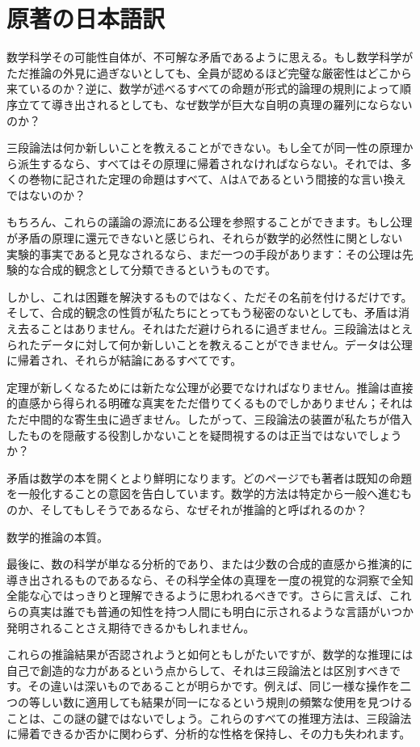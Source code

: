\documentclass[a4paper,11pt,openany]{ltjsbook}
\begin{document}
\section{原著の日本語訳}
数学科学その可能性自体が、不可解な矛盾であるように思える。もし数学科学がただ推論の外見に過ぎないとしても、全員が認めるほど完璧な厳密性はどこから来ているのか？逆に、数学が述べるすべての命題が形式的論理の規則によって順序立てて導き出されるとしても、なぜ数学が巨大な自明の真理の羅列にならないのか？

三段論法は何か新しいことを教えることができない。もし全てが同一性の原理から派生するなら、すべてはその原理に帰着されなければならない。それでは、多くの巻物に記された定理の命題はすべて、AはAであるという間接的な言い換えではないのか？

もちろん、これらの議論の源流にある公理を参照することができます。もし公理が矛盾の原理に還元できないと感じられ、それらが数学的必然性に関としない実験的事実であると見なされるなら、まだ一つの手段があります：その公理は先験的な合成的観念として分類できるというものです。

しかし、これは困難を解決するものではなく、ただその名前を付けるだけです。そして、合成的観念の性質が私たちにとってもう秘密のないとしても、矛盾は消え去ることはありません。それはただ避けられるに過ぎません。三段論法はとえられたデータに対して何か新しいことを教えることができません。データは公理に帰着され、それらが結論にあるすべてです。

定理が新しくなるためには新たな公理が必要でなければなりません。推論は直接的直感から得られる明確な真実をただ借りてくるものでしかありません；それはただ中間的な寄生虫に過ぎません。したがって、三段論法の装置が私たちが借入したものを隠蔽する役割しかないことを疑問視するのは正当ではないでしょうか？

矛盾は数学の本を開くとより鮮明になります。どのページでも著者は既知の命題を一般化することの意図を告白しています。数学的方法は特定から一般へ進むものか、そしてもしそうであるなら、なぜそれが推論的と呼ばれるのか？

数学的推論の本質。

最後に、数の科学が単なる分析的であり、または少数の合成的直感から推演的に導き出されるものであるなら、その科学全体の真理を一度の視覚的な洞察で全知全能な心ではっきりと理解できるように思われるべきです。さらに言えば、これらの真実は誰でも普通の知性を持つ人間にも明白に示されるような言語がいつか発明されることさえ期待できるかもしれません。

これらの推論結果が否認されようと如何ともしがたいですが、数学的な推理には自己で創造的な力があるという点からして、それは三段論法とは区別すべきです。その違いは深いものであることが明らかです。例えば、同じ一様な操作を二つの等しい数に適用しても結果が同一になるという規則の頻繁な使用を見つけることは、この謎の鍵ではないでしょう。これらのすべての推理方法は、三段論法に帰着できるか否かに関わらず、分析的な性格を保持し、その力も失われます。
\end{document}
